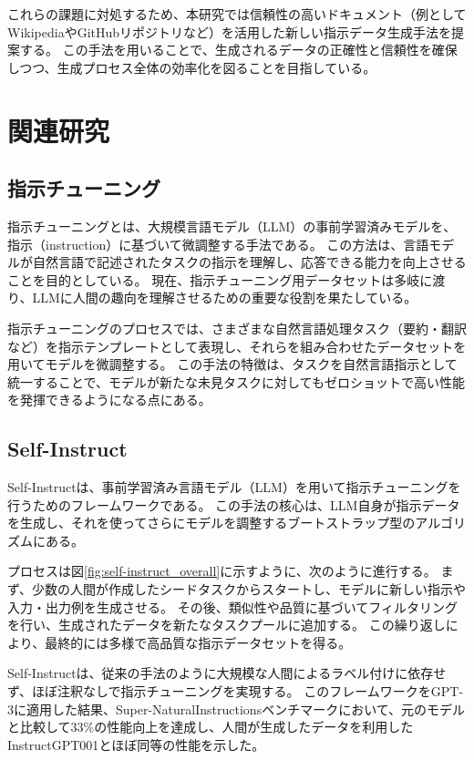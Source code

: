 \documentclass[twocolumn]{jsarticle}
\begin{document}
これらの課題に対処するため、本研究では信頼性の高いドキュメント（例としてWikipediaやGitHubリポジトリなど）を活用した新しい指示データ生成手法を提案する。
この手法を用いることで、生成されるデータの正確性と信頼性を確保しつつ、生成プロセス全体の効率化を図ることを目指している。




\section{関連研究}


\subsection{指示チューニング}
指示チューニング\cite{Instruction-Tuning}とは、大規模言語モデル（LLM）の事前学習済みモデルを、指示（instruction）に基づいて微調整する手法である。
この方法は、言語モデルが自然言語で記述されたタスクの指示を理解し、応答できる能力を向上させることを目的としている。
現在、指示チューニング用データセットは多岐に渡り、LLMに人間の趣向を理解させるための重要な役割を果たしている。

指示チューニングのプロセスでは、さまざまな自然言語処理タスク（要約・翻訳など）を指示テンプレートとして表現し、それらを組み合わせたデータセットを用いてモデルを微調整する。
この手法の特徴は、タスクを自然言語指示として統一することで、モデルが新たな未見タスクに対してもゼロショットで高い性能を発揮できるようになる点にある。

\subsection{Self-Instruct}
Self-Instruct\cite{Self-Instruct}は、事前学習済み言語モデル（LLM）を用いて指示チューニングを行うためのフレームワークである。
この手法の核心は、LLM自身が指示データを生成し、それを使ってさらにモデルを調整するブートストラップ型のアルゴリズムにある。

プロセスは図\ref{fig:self-instruct_overall}に示すように、次のように進行する。
まず、少数の人間が作成したシードタスクからスタートし、モデルに新しい指示や入力・出力例を生成させる。
その後、類似性や品質に基づいてフィルタリングを行い、生成されたデータを新たなタスクプールに追加する。
この繰り返しにより、最終的には多様で高品質な指示データセットを得る。

Self-Instructは、従来の手法のように大規模な人間によるラベル付けに依存せず、ほぼ注釈なしで指示チューニングを実現する。
このフレームワークをGPT-3に適用した結果、Super-NaturalInstructionsベンチマーク\cite{Super-NaturalInstructions}において、元のモデルと比較して33\%の性能向上を達成し、人間が生成したデータを利用したInstructGPT001\cite{InstructGPT}とほぼ同等の性能を示した。
\end{document}

